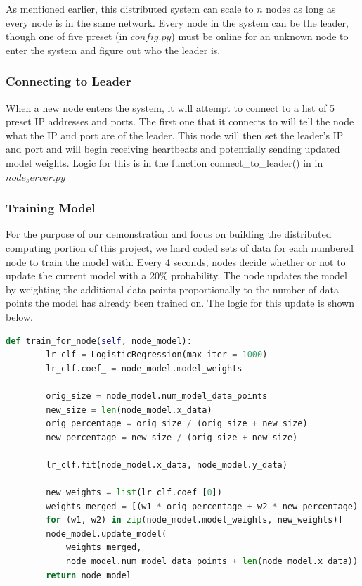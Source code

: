 \documentclass{article}
\begin{document}
As mentioned earlier, this distributed system can scale to $n$ nodes as long as every node is in the same network. Every node in the system can be the leader, though one of five preset (in $config.py$) must be online for an unknown node to enter the system and figure out who the leader is. 

\subsubsection{Connecting to Leader}

When a new node enters the system, it will attempt to connect to a list of 5 preset IP addresses and ports. The first one that it connects to will tell the node what the IP and port are of the leader. This node will then set the leader's IP and port and will begin receiving heartbeats and potentially sending updated model weights. Logic for this is in the function connect\_to\_leader() in in $node_server.py$
    

\subsubsection{Training Model}

For the purpose of our demonstration and focus on building the distributed computing portion of this project, we hard coded sets of data for each numbered node to train the model with. Every 4 seconds, nodes decide whether or not to update the current model with a 20\% probability. The node updates the model by weighting the additional data points proportionally to the number of data points the model has already been trained on. The logic for this update is shown below.

\begin{lstlisting}[language=Python]
    def train_for_node(self, node_model):
        lr_clf = LogisticRegression(max_iter = 1000)
        lr_clf.coef_ = node_model.model_weights

        orig_size = node_model.num_model_data_points
        new_size = len(node_model.x_data)
        orig_percentage = orig_size / (orig_size + new_size)
        new_percentage = new_size / (orig_size + new_size)

        lr_clf.fit(node_model.x_data, node_model.y_data)

        new_weights = list(lr_clf.coef_[0])
        weights_merged = [(w1 * orig_percentage + w2 * new_percentage) 
        for (w1, w2) in zip(node_model.model_weights, new_weights)]
        node_model.update_model(
            weights_merged, 
            node_model.num_model_data_points + len(node_model.x_data))
        return node_model
\end{lstlisting}
\end{document}
